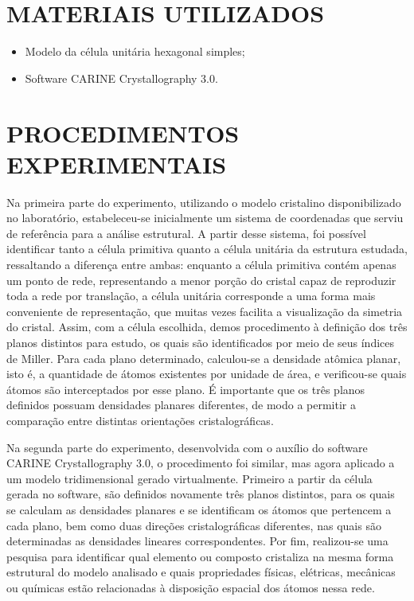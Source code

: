 \documentclass[10pt,twocolumn,letterpaper]{article}
\begin{document}
\vspace{.75cm}

\section{MATERIAIS UTILIZADOS}
\begin{itemize}
    \item Modelo da célula unitária hexagonal simples;
    \item Software CARINE Crystallography 3.0. 
\end{itemize}

\vspace{.75cm}

\section{PROCEDIMENTOS EXPERIMENTAIS}

\hspace{1cm} Na primeira parte do experimento, utilizando o modelo cristalino disponibilizado no laboratório, estabeleceu-se inicialmente um sistema de coordenadas que serviu de referência para a análise estrutural. A partir desse sistema, foi possível identificar tanto a célula primitiva quanto a célula unitária da estrutura estudada, ressaltando a diferença entre ambas: enquanto a célula primitiva contém apenas um ponto de rede, representando a menor porção do cristal capaz de reproduzir toda a rede por translação, a célula unitária corresponde a uma forma mais conveniente de representação, que muitas vezes facilita a visualização da simetria do cristal. Assim, com a célula escolhida, demos procedimento à definição dos três planos distintos para estudo, os quais são identificados por meio de seus índices de Miller. Para cada plano determinado, calculou-se a densidade atômica planar, isto é, a quantidade de átomos existentes por unidade de área, e verificou-se quais átomos são interceptados por esse plano. É importante que os três planos definidos possuam densidades planares diferentes, de modo a permitir a comparação entre distintas orientações cristalográficas.

\hspace{1cm} Na segunda parte do experimento, desenvolvida com o auxílio do software CARINE Crystallography 3.0, o procedimento foi similar, mas agora aplicado a um modelo tridimensional gerado virtualmente. Primeiro a partir da célula gerada no software, são definidos novamente três planos distintos, para os quais se calculam as densidades planares e se identificam os átomos que pertencem a cada plano, bem como duas direções cristalográficas diferentes, nas quais são determinadas as densidades lineares correspondentes. Por fim, realizou-se uma pesquisa para identificar qual elemento ou composto cristaliza na mesma forma estrutural do modelo analisado e quais propriedades físicas, elétricas, mecânicas ou químicas estão relacionadas à disposição espacial dos átomos nessa rede.
\end{document}
